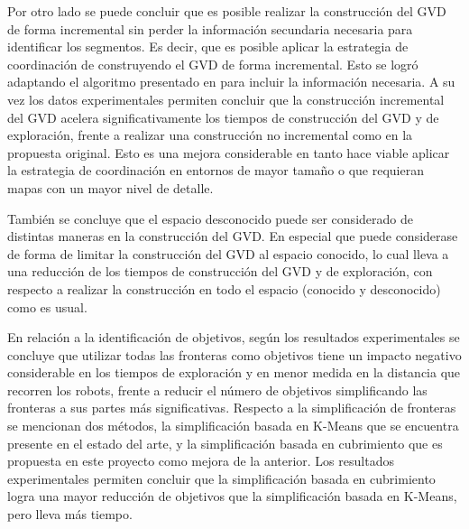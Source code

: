 Por otro lado se puede concluir que es posible realizar la construcción del GVD
de forma incremental sin perder la información secundaria necesaria para
identificar los segmentos. Es decir, que es posible aplicar la estrategia de
coordinación de \cite{wurm2008coordinated} construyendo el GVD de forma
incremental. Esto se logró adaptando el algoritmo presentado en \cite{Lau2013}
para incluir la información necesaria. A su vez los datos experimentales permiten
concluir que la construcción incremental del GVD acelera significativamente los
tiempos de construcción del GVD y de exploración, frente a realizar una
construcción no incremental como en la propuesta original. Esto es una mejora
considerable en tanto hace viable aplicar la estrategia de coordinación en
entornos de mayor tamaño o que requieran mapas con un mayor nivel de detalle.


También se concluye que el espacio desconocido puede ser considerado de
distintas maneras en la construcción del GVD. En especial que puede considerase
de forma de limitar la construcción del GVD al espacio conocido, lo cual lleva
a una reducción de los tiempos de construcción del GVD y de exploración, con
respecto a realizar la construcción en todo el espacio (conocido y desconocido)
como es usual.




En relación a la identificación de objetivos, según los resultados
experimentales se concluye que utilizar todas las fronteras como objetivos
tiene un impacto negativo considerable en los tiempos de exploración y en menor
medida en la distancia que recorren los robots, frente a reducir el número de
objetivos simplificando las fronteras a sus partes más significativas.
Respecto a la simplificación de fronteras se mencionan dos métodos, la
simplificación basada en K-Means que se encuentra presente en el estado del
arte, y la simplificación basada en cubrimiento que es propuesta en este proyecto como
mejora de la anterior. Los resultados experimentales permiten concluir que la
simplificación basada en cubrimiento logra una mayor reducción de objetivos que
la simplificación basada en K-Means, pero lleva más tiempo.

